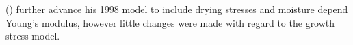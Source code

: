 (\cite{Yamamoto_2002}) further advance his 1998 model to
include drying stresses and moisture depend Young's modulus, however little
changes were made with regard to the growth stress model.